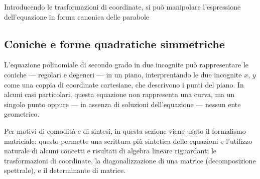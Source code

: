 \documentclass[letterpaper,10pt,italian]{jupyterBook}
\begin{document}
\sphinxAtStartPar
Introducendo le trasformazioni di coordinate, si può manipolare l’espressione dell’equazione in forma canonica delle parabole

\sphinxstepscope


\subsection{Coniche e forme quadratiche simmetriche}
\label{\detokenize{ch/analytic_geometry/analytic_geometry_2d/conics-and-quadratic-forms:coniche-e-forme-quadratiche-simmetriche}}\label{\detokenize{ch/analytic_geometry/analytic_geometry_2d/conics-and-quadratic-forms:geometry-analytic-2d-conics-and-quadratic-forms}}\label{\detokenize{ch/analytic_geometry/analytic_geometry_2d/conics-and-quadratic-forms::doc}}
\sphinxAtStartPar
L’equazione polinomiale di secondo grado in due incognite può rappresentare le coniche — regolari e degeneri — in un piano, interprentando le due incognite \(x\), \(y\) come una coppia di coordinate cartesiane, che descrivono i punti del piano. In alcuni casi particolari, questa equazione non rappresenta una curva, ma un singolo punto oppure — in assenza di soluzioni dell’equazione — nessun ente geometrico.

\sphinxAtStartPar
Per motivi di comodità e di sintesi, in questa sezione viene usato il formalismo matriciale: questo permette una scrittura più sintetica delle equazioni e l’utilizzo naturale di alcuni concetti e risultati di algebra lineare riguardanti le trasformazioni di coordinate, la diagonalizzazione di una matrice (decomposizione spettrale), e il determinante di matrice.
\end{document}

